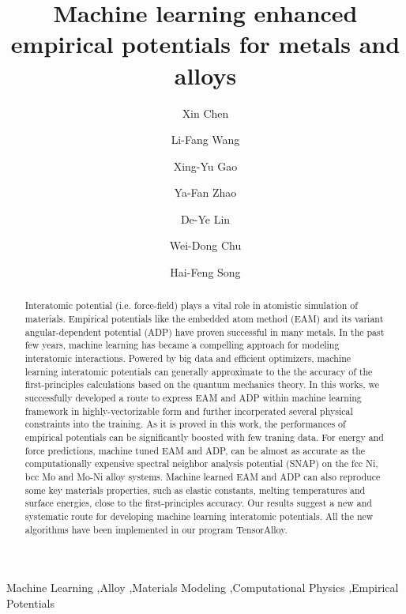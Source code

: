 \documentclass[final,3p,times]{elsarticle}
\begin{document}
\begin{frontmatter}

\title{
    Machine learning enhanced empirical potentials for metals and alloys
}

\author[a]{Xin Chen}
\author[a]{Li-Fang Wang}
\author[a]{Xing-Yu Gao}
\author[b,c]{Ya-Fan Zhao}
\author[b,c]{De-Ye Lin}
\author[a]{Wei-Dong Chu}
\author[a]{Hai-Feng Song}

\address[a]{Laboratory of Computational Physics, Institute of Applied Physics 
and Computational Mathematics, Beijing 100088, China}
\address[b]{CAEP Software Center for High Performance Numerical Simulation, 
Beijing 100088, China}
\address[c]{Institute of Applied Physics and Computational Mathematics, Beijing 
100088, China}


% 
%
\begin{abstract}
Interatomic potential (i.e. force-field) plays a vital role in atomistic 
simulation of materials. 
Empirical potentials like the embedded atom method (EAM) and its variant 
angular-dependent potential (ADP) have proven successful in many 
metals. In the past few years, machine learning has became a 
compelling approach for modeling interatomic interactions. Powered by big data 
and efficient optimizers, machine learning interatomic potentials can generally 
approximate to the the accuracy of the first-principles calculations based on 
the quantum mechanics theory. In this works, we successfully 
developed a route to express EAM and ADP within machine learning framework in 
highly-vectorizable form and further incorperated several physical constraints 
into the training. As it is proved in this work, the performances of empirical 
potentials can be significantly boosted with few traning data.
For energy and force 
predictions, machine tuned EAM and ADP, can be 
almost as accurate as the computationally expensive spectral neighbor analysis 
potential (SNAP) on the fcc Ni, bcc Mo and Mo-Ni alloy systems. 
Machine learned EAM and ADP can also 
reproduce some key materials properties, such as elastic constants, melting 
temperatures and surface energies, close to the first-principles accuracy. 
Our results suggest a new and systematic route for developing machine learning 
interatomic potentials. All the new algorithms have been implemented in our 
program TensorAlloy.
\end{abstract}

\begin{keyword}
Machine Learning \sep Alloy \sep Materials Modeling \sep Computational Physics 
\sep Empirical Potentials    
\end{keyword}
    
\end{frontmatter}
\end{document}

